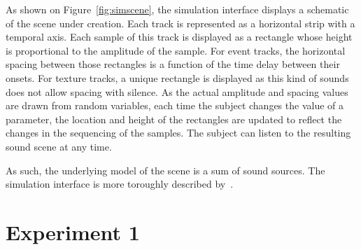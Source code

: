 \documentclass[12pt]{elsarticle}
\newcommand{\cf}{cf.}
\begin{document}

As shown on Figure~\ref{fig:simscene}, the simulation interface displays a schematic of the scene under creation. Each track is represented as a horizontal strip with a temporal axis. Each sample of this track is displayed as a rectangle whose height is proportional to the amplitude of the sample. For event tracks, the horizontal spacing between those rectangles is a function of the time delay between their onsets. For texture tracks, a unique rectangle is displayed as this kind of sounds does not allow spacing with silence. As the actual amplitude and spacing values are drawn from random variables, each time the subject changes the value of a parameter, the location and height of the rectangles are updated to reflect the changes in the sequencing of the samples. The subject can listen to the resulting sound scene at any time.


As such, the underlying model of the scene is a sum of sound sources. The simulation interface is more toroughly described by~\cite{rossignol2015simscene}.




\section{Experiment 1}
\label{sec:simulation}
\end{document}
